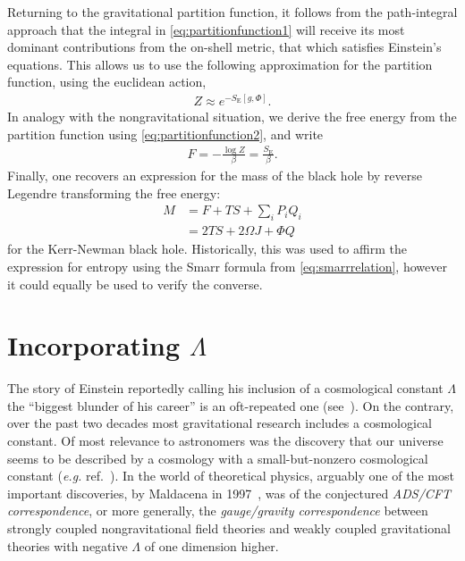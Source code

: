 \documentclass[
twoside,
openright,
frontopenright,
]{dmathesis}
\newcommand{\nn}{\nonumber}
\begin{document}
Returning to the gravitational partition function, it follows from the
path-integral approach that the integral in \cref{eq:partitionfunction1} will
receive its most dominant contributions from the on-shell metric, that which
satisfies Einstein's equations. This allows us to use the following
approximation for the partition function, using the euclidean action,
\begin{align}
  \label{eq:partitionfunction3}
  Z  \approx e^{-S_\mathrm{E}[g,\Phi]}.
\end{align}
In analogy with the nongravitational situation, we derive the free energy
from the partition function using \cref{eq:partitionfunction2}, and write
\begin{align}
  \label{eq:freeenergy1}
  F = -\frac{\log Z}{\beta}=\frac{S_\mathrm{E}}{\beta}.
\end{align}
Finally, one recovers an expression for the mass of the black hole by reverse
Legendre transforming the free energy:
\begin{align}
  \label{eq:massfromaction}
  M &= F + TS + \sum_iP_i Q_i\nn\\
    &= 2TS + 2\Omega J + \Phi Q
\end{align}
for the Kerr-Newman black hole. Historically, this was used to affirm the
expression for entropy using the Smarr formula from \cref{eq:smarrrelation},
however it could equally be used to verify the converse.


\section{Incorporating $\Lambda$}
\label{sec:BHTDlambda}

The story of Einstein reportedly calling his inclusion of a cosmological
constant $\Lambda$ the ``biggest blunder of his career'' is an oft-repeated one
(see~\cite{Weinstein:2013aa}). On the contrary, over the past two decades most
gravitational research includes a cosmological constant. Of most relevance to
astronomers was the discovery that our universe seems to be described by a
cosmology with a small-but-nonzero cosmological constant (\emph{e.g.}
ref.~\cite{Spergel:2006hy}). In the world of theoretical physics, arguably one
of the most important discoveries, by Maldacena in 1997~\cite{Maldacena:1997re},
was of the conjectured \emph{ADS/CFT correspondence}, or more generally, the
\emph{gauge/gravity correspondence} between strongly coupled nongravitational
field theories and weakly coupled gravitational theories with negative $\Lambda$
of one dimension higher.
\end{document}
